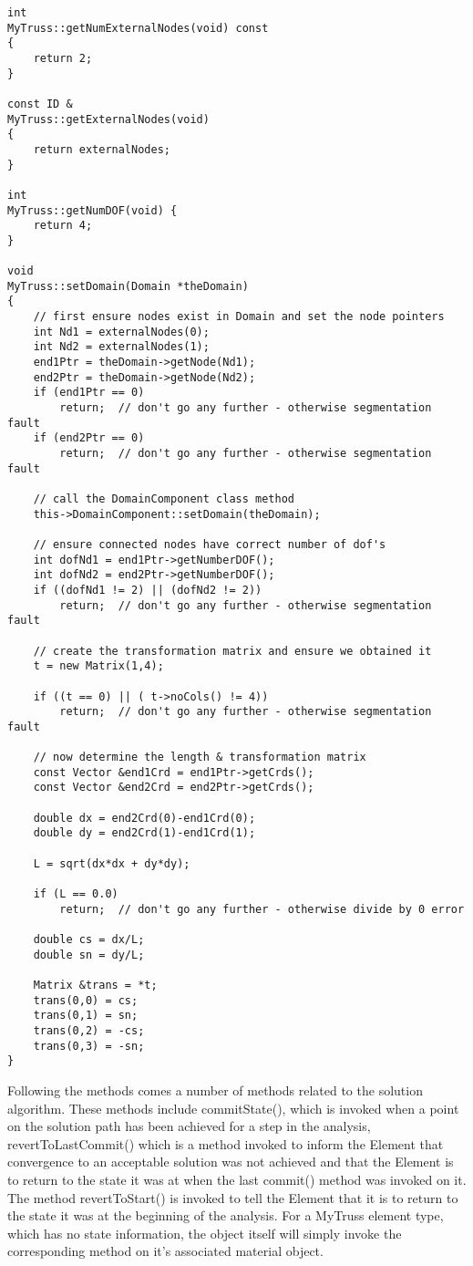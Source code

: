 \documentclass[12pt]{article}
\begin{document}
{\sf\small
\begin{verbatim}
int
MyTruss::getNumExternalNodes(void) const
{
    return 2;
}

const ID &
MyTruss::getExternalNodes(void) 
{
    return externalNodes;
}

int
MyTruss::getNumDOF(void) {
    return 4;
}

void
MyTruss::setDomain(Domain *theDomain)
{
    // first ensure nodes exist in Domain and set the node pointers
    int Nd1 = externalNodes(0);
    int Nd2 = externalNodes(1);
    end1Ptr = theDomain->getNode(Nd1);
    end2Ptr = theDomain->getNode(Nd2);	
    if (end1Ptr == 0) 
        return;  // don't go any further - otherwise segmentation fault
    if (end2Ptr == 0) 
        return;  // don't go any further - otherwise segmentation fault
    
    // call the DomainComponent class method
    this->DomainComponent::setDomain(theDomain);

    // ensure connected nodes have correct number of dof's
    int dofNd1 = end1Ptr->getNumberDOF();
    int dofNd2 = end2Ptr->getNumberDOF();	
    if ((dofNd1 != 2) || (dofNd2 != 2)) 
        return;  // don't go any further - otherwise segmentation fault

    // create the transformation matrix and ensure we obtained it
    t = new Matrix(1,4);

    if ((t == 0) || ( t->noCols() != 4)) 
        return;  // don't go any further - otherwise segmentation fault
    
    // now determine the length & transformation matrix
    const Vector &end1Crd = end1Ptr->getCrds();
    const Vector &end2Crd = end2Ptr->getCrds();	

    double dx = end2Crd(0)-end1Crd(0);
    double dy = end2Crd(1)-end1Crd(1);	
    
    L = sqrt(dx*dx + dy*dy);
    
    if (L == 0.0) 
        return;  // don't go any further - otherwise divide by 0 error
	
    double cs = dx/L;
    double sn = dy/L;

    Matrix &trans = *t;
    trans(0,0) = cs;
    trans(0,1) = sn;    
    trans(0,2) = -cs;
    trans(0,3) = -sn;
}   	 
\end{verbatim}
}

Following the methods comes a number of methods related to the
solution algorithm. These methods include {\sf commitState()}, which
is invoked when a point on the solution path has been achieved for a
step in the analysis, {\sf revertToLastCommit()} which is a method
invoked to inform the Element that convergence to an acceptable
solution was not achieved and that the Element is to return to the
state it was at when the last {\sf commit()} method was invoked on
it.  The method {\sf revertToStart()} is invoked to tell the Element
that it is to return to the state it was at the beginning of the
analysis. For a MyTruss element type, which has no state information,
the object itself will simply invoke the corresponding method on it's
associated material object.
\end{document}
